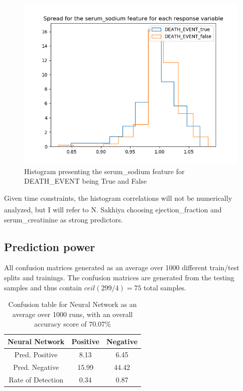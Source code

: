 \documentclass[a4paper, UKenglish]{article}
\newcommand{\0}{\mathbf{0}}
\newcommand{\1}{\mathbf{1}}
\newcommand{\citesup}[1]{\textsuperscript{\cite{#1}}}
\begin{document}
\begin{figure}[H]
        \centering
        \includegraphics[scale=0.6]{images/serum_sodium.png}
        \caption{Histogram presenting the serum{\_}sodium feature for DEATH{\_}EVENT being True and False}
        \label{fig:serum_sodium}
\end{figure}


Given time constraints, the histogram correlations will not be numerically analyzed, but I will refer to N. Sakhiya\citesup{nayan} choosing ejection\_fraction and serum\_creatinine as strong predictors.


\subsection{Prediction power}
All confusion matrices generated as an average over 1000 different train/test splits and trainings. The confusion matrices are generated from the testing samples and thus contain $ceil(299/4) = 75$ total samples.


\begin{table}[H]
\centering
\caption{Confusion table for Neural Network as an average over 1000 runs, with an overall accuracy score of 70.07{\%}}
\label{tab:Neural Network}
\begin{tabular}{|c||c|c|}
\hline
Neural Network       & Positive   & Negative   \\
\hline
\hline
Pred. Positive & 8.13  & 6.45 \\
\hline
Pred. Negative & 15.99 & 44.42  \\
\hline
\hline
Rate of Detection & 0.34 & 0.87 \\
\hline
\end{tabular}
\end{table}
\end{document}
